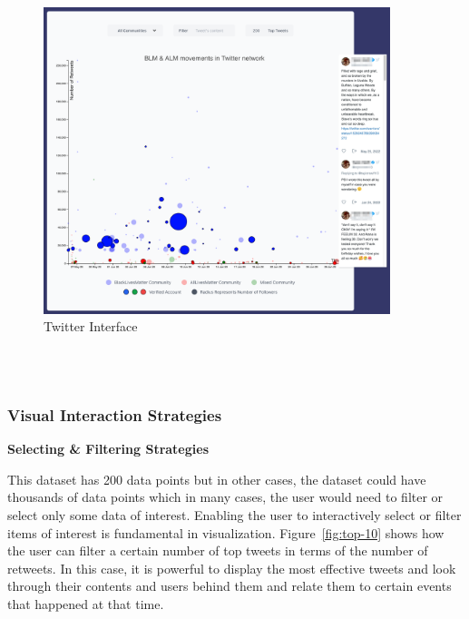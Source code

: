 \begin{figure}[H]
\centering
\captionsetup{justification=centering}
\includegraphics[width=0.9\textwidth]{Report-latex/tex_files/pics/example/twitter.png}
\caption{Twitter Interface}
\label{fig:e-twitter}
\end{figure}

\\\

\subsubsection{Visual Interaction Strategies}

\textbf{Selecting \& Filtering Strategies}

This dataset has 200 data points but in other cases, the dataset could have thousands of data points which in many cases, the user would need to filter or select only some data of interest. Enabling the user to interactively select or filter items of interest is fundamental in visualization. Figure~\ref{fig:top-10} shows how the user can filter a certain number of top tweets in terms of the number of retweets. In this case, it is powerful to display the most effective tweets and look through their contents and users behind them and relate them to certain events that happened at that time. 


